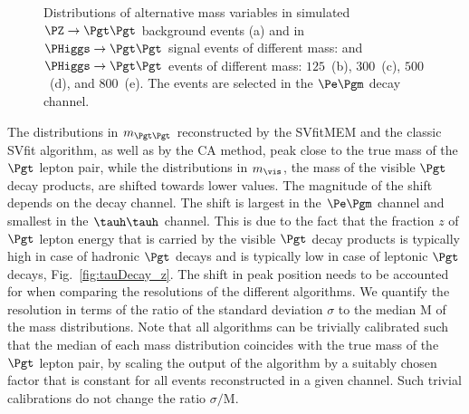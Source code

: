 \begin{figure}
\begin{center}
\end{center}
\caption{
  Distributions of alternative mass variables in simulated $\PZ \to \Pgt\Pgt$ background events (a) 
  and in $\PHiggs \to \Pgt\Pgt$ signal events of different mass:
  and $\PHiggs \to \Pgt\Pgt$ events of different mass:
  $125$~\GeV (b), $300$~\GeV (c), $500$~\GeV (d), and $800$~\GeV (e).
  The events are selected in the $\Pe\Pgm$ decay channel.
}
\label{fig:massDistributions_mssm_emu}
\end{figure}

The distributions in $m_{\Pgt\Pgt}$ reconstructed by the SVfitMEM and the classic SVfit algorithm,
as well as by the CA method, peak close to the true mass of the $\Pgt$ lepton pair,
while the distributions in $m_{\vis}$,
the mass of the visible $\Pgt$ decay products,
are shifted towards lower values.
The magnitude of the shift depends on the decay channel.
The shift is largest in the $\Pe\Pgm$ channel and smallest in the $\tauh\tauh$ channel.
This is due to the fact that the fraction $z$ of $\Pgt$ lepton energy that is carried by the visible $\Pgt$ decay products
is typically high in case of hadronic $\Pgt$ decays and is typically low in case of leptonic $\Pgt$ decays,
\cf Fig.~\ref{fig:tauDecay_z}.
The shift in peak position needs to be accounted for when comparing the resolutions of the different algorithms.
We quantify the resolution in terms of the ratio
of the standard deviation $\sigma$ to the median $\textrm{M}$
of the mass distributions.
Note that all algorithms can be trivially calibrated such that the median of each mass distribution coincides with the true mass of the $\Pgt$ lepton pair,
by scaling the output of the algorithm by a suitably chosen factor that is constant for all events reconstructed in a given channel.
Such trivial calibrations do not change the ratio $\sigma/\textrm{M}$.

